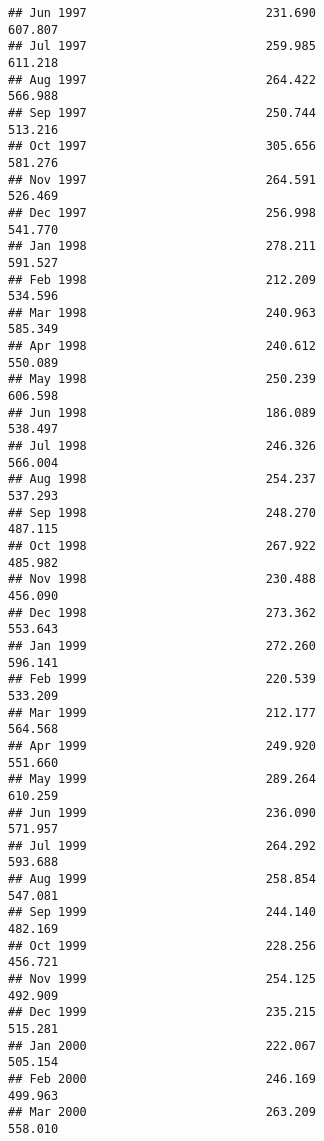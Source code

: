 \documentclass[
]{article}
\begin{document}
\begin{verbatim}
## Jun 1997                         231.690                           607.807
## Jul 1997                         259.985                           611.218
## Aug 1997                         264.422                           566.988
## Sep 1997                         250.744                           513.216
## Oct 1997                         305.656                           581.276
## Nov 1997                         264.591                           526.469
## Dec 1997                         256.998                           541.770
## Jan 1998                         278.211                           591.527
## Feb 1998                         212.209                           534.596
## Mar 1998                         240.963                           585.349
## Apr 1998                         240.612                           550.089
## May 1998                         250.239                           606.598
## Jun 1998                         186.089                           538.497
## Jul 1998                         246.326                           566.004
## Aug 1998                         254.237                           537.293
## Sep 1998                         248.270                           487.115
## Oct 1998                         267.922                           485.982
## Nov 1998                         230.488                           456.090
## Dec 1998                         273.362                           553.643
## Jan 1999                         272.260                           596.141
## Feb 1999                         220.539                           533.209
## Mar 1999                         212.177                           564.568
## Apr 1999                         249.920                           551.660
## May 1999                         289.264                           610.259
## Jun 1999                         236.090                           571.957
## Jul 1999                         264.292                           593.688
## Aug 1999                         258.854                           547.081
## Sep 1999                         244.140                           482.169
## Oct 1999                         228.256                           456.721
## Nov 1999                         254.125                           492.909
## Dec 1999                         235.215                           515.281
## Jan 2000                         222.067                           505.154
## Feb 2000                         246.169                           499.963
## Mar 2000                         263.209                           558.010

\end{verbatim}
\end{document}
